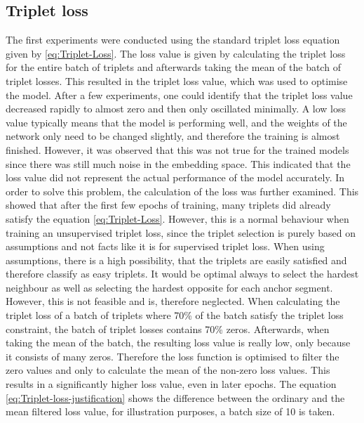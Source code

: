 \subsection{Triplet loss}
The first experiments were conducted using the standard triplet loss equation given by \ref{eq:Triplet-Loss}. The loss value is given by calculating the triplet loss for the entire batch of triplets and afterwards taking the mean of the batch of triplet losses. This resulted in the triplet loss value, which was used to optimise the model. After a few experiments, one could identify that the triplet loss value decreased rapidly to almost zero and then only oscillated minimally. A low loss value typically means that the model is performing well, and the weights of the network only need to be changed slightly, and therefore the training is almost finished. However, it was observed that this was not true for the trained models since there was still much noise in the embedding space. This indicated that the loss value did not represent the actual performance of the model accurately.
\newline
\newline
In order to solve this problem, the calculation of the loss was further examined. This showed that after the first few epochs of training, many triplets did already satisfy the equation \ref{eq:Triplet-Loss}. However, this is a normal behaviour when training an unsupervised triplet loss, since the triplet selection is purely based on assumptions and not facts like it is for supervised triplet loss. When using assumptions, there is a high possibility, that the triplets are easily satisfied and therefore classify as easy triplets. It would be optimal always to select the hardest neighbour as well as selecting the hardest opposite for each anchor segment. However, this is not feasible and is, therefore neglected.
\newline
\newline
When calculating the triplet loss of a batch of triplets where 70\% of the batch satisfy the triplet loss constraint, the batch of triplet losses contains 70\% zeros. Afterwards, when taking the mean of the batch, the resulting loss value is really low, only because it consists of many zeros. Therefore the loss function is optimised to filter the zero values and only to calculate the mean of the non-zero loss values. This results in a significantly higher loss value, even in later epochs. The equation \ref{eq:Triplet-loss-justification} shows the difference between the ordinary and the mean filtered loss value, for illustration purposes, a batch size of 10 is taken.
